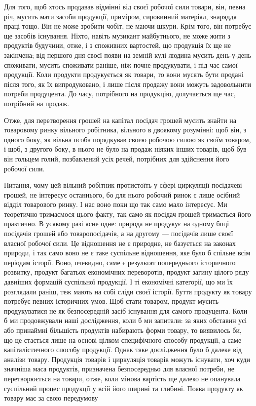 Для того, щоб хтось продавав відмінні від своєї робочої сили
товари, він, певна річ, мусить мати засоби продукції, приміром,
сировинний матеріял, знаряддя праці тощо. Він не може зробити
чобіт, не маючи шкури. Крім того, він потребує ще засобів існування.
Ніхто, навіть музикант майбутнього, не може жити з
продуктів будучини, отже, і з споживних вартостей, що продукція
їх ще не закінчена; від першого дня своєї появи на земній
кулі людина мусить день-у-день споживати, мусить споживати
раніше, ніж почне продукувати, і під час самої продукції. Коли
продукти продукується як товари, то вони мусять бути продані
після того, як їх випродуковано, і лише після продажу вони
можуть задовольнити потреби продуцента. До часу, потрібного
на продукцію, долучається ще час, потрібний на продаж.

Отже, для перетворення грошей на капітал посідач грошей
мусить знайти на товаровому ринку вільного робітника, вільного
в двоякому розумінні: щоб він, з одного боку, як вільна особа
порядкував своєю робочою силою як своїм товаром, і щоб, з
другого боку, в нього не було на продаж ніяких інших товарів,
щоб був він гольцем голий, позбавлений усіх речей, потрібних
для здійснення його робочої сили.

Питання, чому цей вільний робітник протистоїть у сфері
циркуляції посідачеві грошей, не інтересує останнього, бо для
нього робочий ринок є лише осібний відділ товарового ринку.
І нас воно поки що так само мало інтересує. Ми теоретично тримаємося
цього факту, так само як посідач грошей тримається
його практично. В усякому разі ясне одне: природа не продукує
на одному боці посідачів грошей або товаропосідачів, а на другому
— посідачів лише своєї власної робочої сили. Це відношення
не є природне, не базується на законах природи, і так само воно
не є таке суспільне відношення, яке було б спільне всім періодам
історії. Воно, очевидно, саме є результат попереднього історичного
розвитку, продукт багатьох економічних переворотів, продукт
загину цілого ряду давніших формацій суспільної продукції.
І ті економічні категорії, що ми їх розглядали раніш, теж
мають на собі сліди своєї історії. Буття продукту як товару
потребує певних історичних умов. Щоб стати товаром, продукт
мусить продукуватися не як безпосередній засіб існування для
самого продуцента. Коли б ми продовжували наші дослідження,
коли б ми запитали: за яких обставин усі або принаймні більшість
продуктів набирають форми товару, то виявилось би, що це
стається лише на основі цілком специфічного способу продукції,
а саме капіталістичного способу продукції. Однак таке дослідження
було б далеке від аналізи товару. Продукція товарів і циркуляція
товарів можуть існувати, хоч куди значніша маса продуктів,
призначена безпосередньо для власної потреби, не перетворюється
на товари, отже, коли мінова вартість ще далеко не
опанувала суспільний процес продукції у всій його ширині та
глибині. Поява продукту як товару має за свою передумову
\parbreak{}  %
